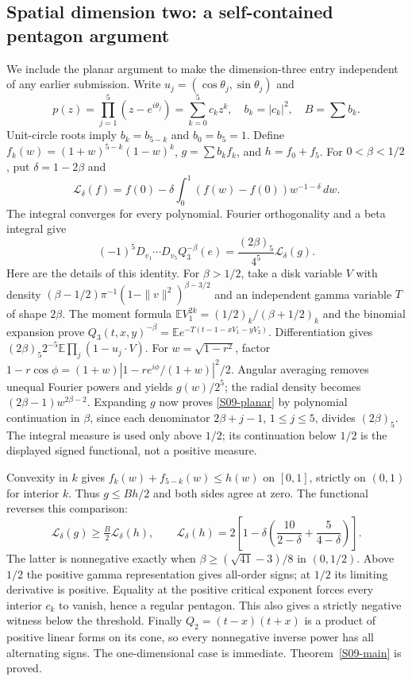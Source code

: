 \documentclass[11pt,a4paper]{article}
\theoremstyle{definition}\newtheorem{definition}[theorem]{Definition}
\theoremstyle{remark}\newtheorem{remark}[theorem]{Remark}
\numberwithin{equation}{section}
\begin{document}
\subsection{Spatial dimension two: a self-contained pentagon argument}\label{S09-sec-5}
We include the planar argument to make the dimension-three entry independent of any earlier submission. Write $u_j=(\cos\theta_j,\sin\theta_j)$ and
\[
 p(z)=\prod_{j=1}^5(z-e^{i\theta_j})=\sum_{k=0}^5c_kz^k,
 \quad b_k=|c_k|^2,\quad B=\sum b_k.
\]
Unit-circle roots imply $b_k=b_{5-k}$ and $b_0=b_5=1$. Define
$f_k(w)=(1+w)^{5-k}(1-w)^k$, $g=\sum b_kf_k$, and $h=f_0+f_5$.
For $0<\beta<1/2$, put $\delta=1-2\beta$ and
\[
 \mathcal L_\delta(f)=f(0)-\delta\int_0^1
 (f(w)-f(0))w^{-1-\delta}\,dw.
\]
The integral converges for every polynomial. Fourier orthogonality and a beta integral give
\begin{equation}\label{S09-planar}
 (-1)^5D_{v_1}\cdots D_{v_5}Q_3^{-\beta}(e)
 =\frac{(2\beta)_5}{4^5}\mathcal L_\delta(g).
\end{equation}
Here are the details of this identity. For $\beta>1/2$, take a disk variable $V$ with density $(\beta-1/2)\pi^{-1}(1-\|v\|^2)^{\beta-3/2}$ and an independent gamma variable $T$ of shape $2\beta$. The moment formula
$\mathbb EV_1^{2k}=(1/2)_k/(\beta+1/2)_k$
and the binomial expansion prove
$Q_3(t,x,y)^{-\beta}=\mathbb E e^{-T(t-1-xV_1-yV_2)}$.
Differentiation gives $(2\beta)_5 2^{-5}\mathbb E\prod_j(1-u_j\cdot V)$.
For $w=\sqrt{1-r^2}$, factor
$1-r\cos\phi=(1+w)|1-r e^{i\phi}/(1+w)|^2/2$.
Angular averaging removes unequal Fourier powers and yields $g(w)/2^5$; the radial density becomes $(2\beta-1)w^{2\beta-2}$. Expanding $g$ now proves \eqref{S09-planar} by polynomial continuation in $\beta$, since each denominator $2\beta+j-1$, $1\le j\le5$, divides $(2\beta)_5$. The integral measure is used only above $1/2$; its continuation below $1/2$ is the displayed signed functional, not a positive measure.

Convexity in $k$ gives $f_k(w)+f_{5-k}(w)\le h(w)$ on $[0,1]$, strictly on $(0,1)$ for interior $k$. Thus $g\le Bh/2$ and both sides agree at zero. The functional reverses this comparison:
\[
 \mathcal L_\delta(g)\ge\tfrac B2\mathcal L_\delta(h),\qquad
 \mathcal L_\delta(h)=2\left[1-\delta\left(\frac{10}{2-\delta}+\frac5{4-\delta}\right)\right].
\]
The latter is nonnegative exactly when $\beta\ge(\sqrt{41}-3)/8$ in $(0,1/2)$. Above $1/2$ the positive gamma representation gives all-order signs; at $1/2$ its limiting derivative is positive. Equality at the positive critical exponent forces every interior $c_k$ to vanish, hence a regular pentagon. This also gives a strictly negative witness below the threshold.
Finally $Q_2=(t-x)(t+x)$ is a product of positive linear forms on its cone, so every nonnegative inverse power has all alternating signs. The one-dimensional case is immediate. Theorem~\ref{S09-main} is proved.
\end{document}
